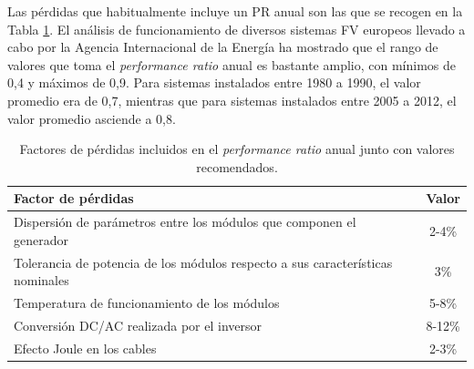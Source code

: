 Las pérdidas que habitualmente incluye un PR anual son las que se
recogen en la Tabla \ref{tab:PR}. El análisis de funcionamiento de diversos sistemas FV europeos llevado a cabo por la Agencia Internacional de la Energía
\cite{Nordmann2014} ha mostrado que el rango de valores que toma el \emph{performance ratio} anual es bastante amplio, con mínimos de 0,4 y máximos de 0,9. Para sistemas instalados entre 1980 a 1990, el valor promedio era de 0,7, mientras que para sistemas instalados entre 2005 a 2012, el valor promedio asciende a 0,8.
%
\begin{table}
  \caption{Factores de pérdidas incluidos en el \emph{performance
      ratio} anual junto con valores recomendados.\label{tab:PR}}

\begin{tabular}{>{\centering}p{8cm}c}
  \toprule 
  Factor de pérdidas & Valor\tabularnewline
                       \midrule
                       \midrule 
                       Dispersión de parámetros entre los módulos que componen el generador  & 2-4\%\tabularnewline
                                                                                               \midrule 
                                                                                               Tolerancia de potencia de los módulos respecto a sus características
                                                                                               nominales  & 3\%\tabularnewline
                                                                                                            \midrule 
                                                                                                            Temperatura de funcionamiento de los módulos  & 5-8\%\tabularnewline
                                                                                                                                                            \midrule 
                                                                                                                                                            Conversión DC/AC realizada por el inversor & 8-12\%\tabularnewline
                                                                                                                                                                                                         \midrule 
                                                                                                                                                                                                         Efecto Joule en los cables  & 2-3\%\tabularnewline

\end{tabular}
\end{table}

